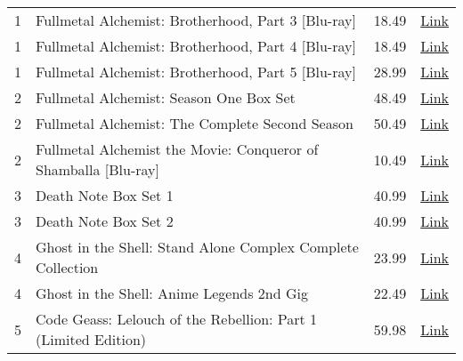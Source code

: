 \documentclass[12pt]{article}
\begin{document}
\begin{longtable}{ | p{1.3cm} | p{12cm} | l | l |}
1 & Fullmetal Alchemist: Brotherhood, Part 3 [Blu-ray] & 18.49 & \href{http://www.amazon.com/Fullmetal-Alchemist-Brotherhood-Part-Blu-ray/dp/B0043988IA/ref=wl_it_dp_o_pd_T1?ie=UTF8&coliid=ILQ0B3KKW3R2B&colid=2CEAJ0SZHT29K}{Link} \\
1 & Fullmetal Alchemist: Brotherhood, Part 4 [Blu-ray] & 18.49 & \href{http://www.amazon.com/Fullmetal-Alchemist-Brotherhood-Part-Blu-ray/dp/B004GZZGVI/ref=wl_it_dp_o_pd_T1?ie=UTF8&coliid=I1YDLY1W9L2FE8&colid=2CEAJ0SZHT29K}{Link} \\
1 & Fullmetal Alchemist: Brotherhood, Part 5 [Blu-ray] & 28.99 & \href{http://www.amazon.com/Fullmetal-Alchemist-Brotherhood-Part-Blu-ray/dp/B004W75BVU/ref=wl_it_dp_o_npd?ie=UTF8&coliid=I23TTNPFPGWE5Y&colid=2CEAJ0SZHT29K}{Link} \\
2 & Fullmetal Alchemist: Season One Box Set & 48.49 & \href{http://www.amazon.com/Fullmetal-Alchemist-Season-One-Box/dp/B001K98M78/ref=wl_it_dp_o_npd?ie=UTF8&coliid=I2H44DT5KMKGI0&colid=2CEAJ0SZHT29K}{Link} \\
2 & Fullmetal Alchemist: The Complete Second Season & 50.49 & \href{http://www.amazon.com/Fullmetal-Alchemist-Complete-Second-Season/dp/B001OMZYDG/ref=wl_it_dp_o_npd?ie=UTF8&coliid=I38Q2H1ZFDIJGJ&colid=2CEAJ0SZHT29K}{Link} \\
2 & Fullmetal Alchemist the Movie: Conqueror of Shamballa [Blu-ray] & 10.49 & \href{http://www.amazon.com/Fullmetal-Alchemist-Movie-Conqueror-Shamballa/dp/B001GXRVVG/ref=wl_it_dp_o_pd_T1?ie=UTF8&coliid=I1UVVQNHBGTYVI&colid=2CEAJ0SZHT29K}{Link} \\
3 & Death Note Box Set 1 & 40.99 & \href{http://www.amazon.com/Death-Note-Box-Set-1/dp/B001CZJP0S/ref=sr_1_1?ie=UTF8&qid=1322587778&sr=8-1}{Link} \\
3 & Death Note Box Set 2 & 40.99 & \href{http://www.amazon.com/Death-Note-Box-Set-2/dp/B001R8B5TO/ref=sr_1_3?ie=UTF8&qid=1322587778&sr=8-3}{Link} \\
4 & Ghost in the Shell: Stand Alone Complex Complete Collection & 23.99 & \href{http://www.amazon.com/Ghost-Shell-Complex-Complete-Collection/dp/B001D265RQ/ref=wl_it_dp_o_npd?ie=UTF8&coliid=IJKV4URIFMNE1&colid=2CEAJ0SZHT29K}{Link} \\
4 & Ghost in the Shell: Anime Legends 2nd Gig & 22.49 & \href{http://www.amazon.com/Ghost-Shell-Anime-Legends-2nd/dp/B002EBRF7O/ref=wl_it_dp_o_npd?ie=UTF8&coliid=I2FZZEG07RECP8&colid=2CEAJ0SZHT29K}{Link} \\
5 & Code Geass: Lelouch of the Rebellion: Part 1 (Limited Edition) & 59.98 & \href{http://www.amazon.com/Code-Geass-Lelouch-Rebellion-Limited/dp/B001AZ5IU6/ref=wl_it_dp_o_pd_T1?ie=UTF8&coliid=IQXZU7A8SWIGU&colid=2CEAJ0SZHT29K}{Link} \\

\end{longtable}
\end{document}

